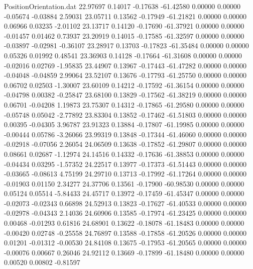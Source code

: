 \begin{filecontents}{PositionOrientation.dat}
  22.97697    0.14017   -0.17638   -61.42580    0.00000    0.00000   -0.05674   -0.03884    2.59031
  23.05711    0.13562   -0.17949   -61.21821    0.00000    0.00000    0.06966    0.03235   -2.01102
  23.13717    0.14120   -0.17690   -61.37921    0.00000    0.00000   -0.01457    0.01462    0.73937
  23.20919    0.14015   -0.17585   -61.32597    0.00000    0.00000   -0.03897   -0.02981   -0.36107
  23.28917    0.13703   -0.17823   -61.35484    0.00000    0.00000    0.05326    0.01992    0.48541
  23.36903    0.14128   -0.17664   -61.31608    0.00000    0.00000   -0.02016    0.02769   -1.95835
  23.44907    0.13967   -0.17443   -61.47282    0.00000    0.00000   -0.04048   -0.04859    2.99064
  23.52107    0.13676   -0.17793   -61.25750    0.00000    0.00000    0.06702    0.02503   -1.30007
  23.60109    0.14212   -0.17592   -61.36154    0.00000    0.00000   -0.04798    0.00382   -0.25847
  23.68100    0.13829   -0.17562   -61.38219    0.00000    0.00000    0.06701   -0.04208    1.19873
  23.75307    0.14312   -0.17865   -61.29580    0.00000    0.00000   -0.05748    0.05042   -2.77892
  23.83304    0.13852   -0.17462   -61.51803    0.00000    0.00000    0.00395   -0.04305    3.96787
  23.91323    0.13884   -0.17807   -61.19985    0.00000    0.00000   -0.00444    0.05786   -3.26066
  23.99319    0.13848   -0.17344   -61.46060    0.00000    0.00000   -0.02918   -0.07056    2.26054
  24.06509    0.13638   -0.17852   -61.29807    0.00000    0.00000    0.08661    0.02687   -1.12974
  24.14516    0.14332   -0.17636   -61.38853    0.00000    0.00000   -0.04434    0.03295   -1.57352
  24.22517    0.13977   -0.17373   -61.51443    0.00000    0.00000   -0.03665   -0.08613    4.75199
  24.29710    0.13713   -0.17992   -61.17264    0.00000    0.00000   -0.01903    0.01150    2.34277
  24.37706    0.13561   -0.17900   -60.98530    0.00000    0.00000    0.05124    0.05514   -5.84433
  24.45717    0.13972   -0.17459   -61.45347    0.00000    0.00000   -0.02073   -0.02343    0.66898
  24.52913    0.13823   -0.17627   -61.40533    0.00000    0.00000   -0.02978   -0.04343    2.14036
  24.60906    0.13585   -0.17974   -61.23425    0.00000    0.00000    0.00468   -0.01293    0.61816
  24.68901    0.13622   -0.18078   -61.18483    0.00000    0.00000   -0.00420    0.02748   -0.25558
  24.76897    0.13588   -0.17858   -61.20526    0.00000    0.00000    0.01201   -0.01312   -0.00530
  24.84108    0.13675   -0.17953   -61.20565    0.00000    0.00000   -0.00076    0.00667    0.26046
  24.92112    0.13669   -0.17899   -61.18480    0.00000    0.00000    0.00520    0.00802   -0.81597

\end{filecontents}
